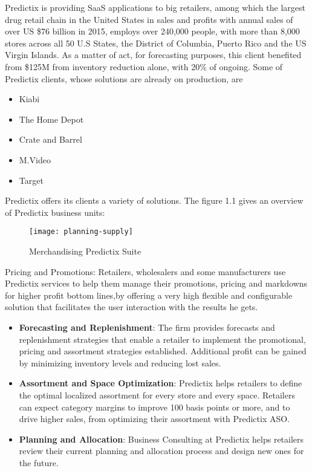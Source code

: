 Predictix is providing SaaS applications to big retailers, among which the
largest drug retail chain in the United States in sales and profits with annual
sales of over US \$76 billion in 2015, employs over 240,000 people, with more
than 8,000 stores  across all 50 U.S States, the District of Columbia, Puerto
Rico and the US Virgin Islands. As a matter of act, for forecasting purposes,
this client benefited from \$125M from inventory reduction alone, with 20\% of
ongoing. Some of Predictix clients, whose solutions are already on production,
are
\begin{itemize}
\item{Kiabi}
\item{The Home Depot}
\item{Crate and Barrel}
\item{M.Video}
\item{Target}
\end{itemize}

Predictix offers its clients a variety of solutions. The figure 1.1 gives an
overview of Predictix business units:

\begin{figure}[h]
  \center
  \texttt{[image: planning-supply]}
\caption{Merchandising Predictix Suite}
\label{fig:planning-supply}
\end{figure}

Pricing and Promotions: Retailers, wholesalers and some manufacturers use
Predictix services to help them manage their promotions, pricing and markdowns
for higher profit bottom lines,by offering a very high flexible and
configurable solution that facilitates the user interaction with the results he
gets.

\begin{itemize}
\item{\textbf{Forecasting  and Replenishment}: The firm provides forecasts and
    replenishment strategies that enable a retailer to implement the
    promotional, pricing and assortment strategies established. Additional
    profit can be gained by minimizing inventory levels and reducing lost
    sales.}

\item{\textbf{Assortment and Space Optimization}: Predictix helps retailers to
    define the optimal localized assortment for every store and every space.
    Retailers can expect category margins to improve 100 basis points or more,
    and to drive higher sales, from optimizing their assortment with Predictix
    ASO.}
\item{\textbf{Planning and  Allocation}: Business Consulting at Predictix helps
    retailers review their current planning and allocation process and design
    new ones for the future.}
\end{itemize}

